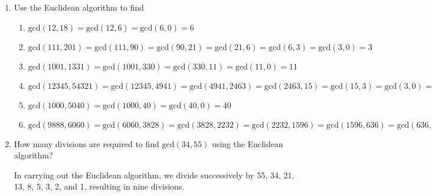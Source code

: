 \documentclass[11pt]{article}
\begin{document}
\begin{enumerate}[label=\textbf{\arabic*.}]
	\pagebreak
	\item Use the Euclidean algorithm to find
	
	\begin{enumerate}[label=\textbf{\alph*)}]
		\item $\text{gcd}(12, 18) = \text{gcd}(12, 6) = \text{gcd}(6, 0) = 6$
		\item $\text{gcd}(111, 201) = \text{gcd}(111, 90) = \text{gcd}(90, 21) = \text{gcd}(21, 6) = \text{gcd}(6, 3) = \text{gcd}(3, 0) = 3$
		\item $\text{gcd}(1001, 1331) = \text{gcd}(1001, 330) = \text{gcd}(330, 11) = \text{gcd}(11, 0) = 11$
		\item $\text{gcd}(12345, 54321) = \text{gcd}(12345, 4941) = \text{gcd}(4941, 2463) = \text{gcd}(2463, 15) = \text{gcd}(15, 3) = \text{gcd}(3, 0) = 3$
		\item $\text{gcd}(1000, 5040) = \text{gcd}(1000, 40) = \text{gcd}(40, 0) = 40$
		\item $\text{gcd}(9888, 6060) = \text{gcd}(6060, 3828) = \text{gcd}(3828, 2232) = \text{gcd}(2232, 1596) = \text{gcd}(1596, 636) = \text{gcd}(636, 324) = \text{gcd}(324, 312) = \text{gcd}(312, 12) = \text{gcd}(12, 0) = 12$
	\end{enumerate}

	\item How many divisions are required to find $\text{gcd}(34, 55)$ using the Euclidean algorithm?
	
	In carrying out the Euclidean algorithm, we divide successively by 55, 34, 21, 13, 8, 5, 3, 2, and 1, resulting in nine divisions.
\end{enumerate}
\end{document}
